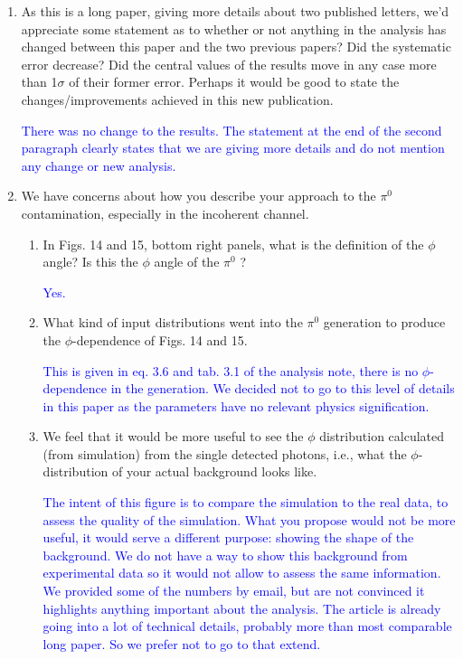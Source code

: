 \documentclass[a4paper,11pt,twoside]{article}
\begin{document}
\begin{enumerate}
\item  As this is a long paper, giving more details about two published letters, we'd appreciate some statement as
to whether or not anything in the analysis has changed between this paper and the two previous papers? Did
the systematic error decrease? Did the central values of the results move in any case more than 1$\sigma$ of their
former error. Perhaps it would be good to state the changes/improvements achieved in this new publication.

   \textcolor{blue}{There was no change to the results. The statement at the end of the second paragraph
clearly states that we are giving more details and do not mention any change or new analysis.}

\item  We have concerns about how you describe your approach to the $\pi^0$ contamination, especially in the incoherent
channel.
\begin{enumerate}
\item In Figs. 14 and 15, bottom right panels, what is the definition of the $\phi$ angle? Is this the $\phi$ angle of the
$\pi^0$ ?

   \textcolor{blue}{Yes.}

\item What kind of input distributions went into the $\pi^0$ generation to produce the $\phi$-dependence of Figs. 14
and 15.

   \textcolor{blue}{This is given in eq. 3.6 and tab. 3.1 of the analysis note, there is no $\phi$-dependence 
   in the generation. We decided not to go to this level 
   of details in this paper as the parameters have no relevant physics signification.}

\item We feel that it would be more useful to see the $\phi$ distribution calculated (from simulation) from the
single detected photons, i.e., what the $\phi$-distribution of your actual background looks like.

   \textcolor{blue}{The intent of this figure is to compare the simulation to the real data, to assess the 
quality of the simulation. What you propose would not be more useful, it would serve a different purpose:
showing the shape of the background. We do not have a way to show this background from experimental 
data so it would not allow to assess the same information. We provided some of the numbers by email, 
but are not convinced it highlights anything important about the analysis. The article is
already going into a lot of technical details, probably more than most comparable long paper. So we prefer not 
to go to that extend.}


\end{enumerate}
\end{enumerate}
\end{document}
